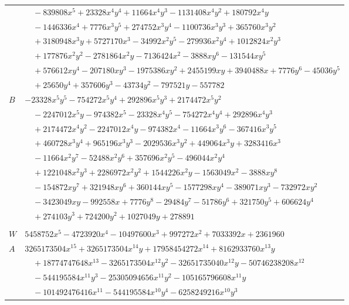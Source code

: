 \documentclass[11pt]{article}
\begin{document}
\begin{longtable}{@{}ll@{}}
 & $\quad -839808x^{5}+23328x^{4}y^{4}+11664x^{4}y^{3}-1131408x^{4}y^{2}+180792x^{4}y$\\
 & $\quad -1446336x^{4}+7776x^{3}y^{5}+274752x^{3}y^{4}-1100736x^{3}y^{3}+365760x^{3}y^{2}$\\
 & $\quad +3180948x^{3}y+5727170x^{3}-34992x^{2}y^{5}-279936x^{2}y^{4}+1012824x^{2}y^{3}$\\
 & $\quad +177876x^{2}y^{2}-2781864x^{2}y-7136424x^{2}-3888xy^{6}-131544xy^{5}$\\
 & $\quad +576612xy^{4}-207180xy^{3}-1975386xy^{2}+2455199xy+3940488x+7776y^{6}-45036y^{5}$\\
 & $\quad +25650y^{4}+357606y^{3}-43734y^{2}-797521y-557782$\\
$B$ & $-23328x^{5}y^{5}-754272x^{5}y^{4}+292896x^{5}y^{3}+2174472x^{5}y^{2}$\\
 & $\quad -2247012x^{5}y-974382x^{5}-23328x^{4}y^{5}-754272x^{4}y^{4}+292896x^{4}y^{3}$\\
 & $\quad +2174472x^{4}y^{2}-2247012x^{4}y-974382x^{4}-11664x^{3}y^{6}-367416x^{3}y^{5}$\\
 & $\quad +460728x^{3}y^{4}+965196x^{3}y^{3}-2029536x^{3}y^{2}+449064x^{3}y+3283416x^{3}$\\
 & $\quad -11664x^{2}y^{7}-52488x^{2}y^{6}+357696x^{2}y^{5}-496044x^{2}y^{4}$\\
 & $\quad +1221048x^{2}y^{3}+2286972x^{2}y^{2}+1544226x^{2}y-1563049x^{2}-3888xy^{8}$\\
 & $\quad -154872xy^{7}+321948xy^{6}+360144xy^{5}-1577298xy^{4}-389071xy^{3}-732972xy^{2}$\\
 & $\quad -3423049xy-992558x+7776y^{8}-29484y^{7}-51786y^{6}+321750y^{5}+606624y^{4}$\\
 & $\quad +274103y^{3}+724200y^{2}+1027049y+278891$\\
\addlinespace[3pt]
\multicolumn{2}{@{}l}{$i=78$, $m=8748$, neighbours $110,7,28,29,40,41,51,60,61,75,81$}\\
$W$ & $5458752x^{5}-4723920x^{4}-10497600x^{3}+997272x^{2}+7033392x+2361960$\\
$A$ & $3265173504x^{15}+3265173504x^{14}y+17958454272x^{14}+8162933760x^{13}y$\\
 & $\quad +18774747648x^{13}-3265173504x^{12}y^{2}-32651735040x^{12}y-50746238208x^{12}$\\
 & $\quad -544195584x^{11}y^{3}-25305094656x^{11}y^{2}-105165796608x^{11}y$\\
 & $\quad -101492476416x^{11}-544195584x^{10}y^{4}-6258249216x^{10}y^{3}$\\

\end{longtable}
\end{document}
